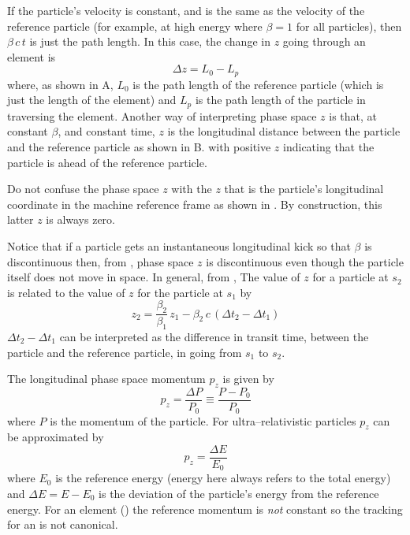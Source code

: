 If the particle's velocity is constant, and is the same as the velocity of the reference particle
(for example, at high energy where $\beta = 1$ for all particles), then $\beta \, c \, t$ is just
the path length. In this case, the change in $z$ going through an element is
\begin{equation}
  \Delta z = L_0 - L_p
\end{equation}
where, as shown in A, $L_0$ is the path length of the reference particle (which
is just the length of the element) and $L_p$ is the path length of the particle in traversing the
element.  Another way of interpreting phase space $z$ is that, at constant $\beta$, and constant
time, $z$ is the longitudinal distance between the particle and the reference particle as shown in
B. with positive $z$ indicating that the particle is ahead of the reference
particle.

Do not confuse the phase space $z$ with the $z$ that is the particle's longitudinal coordinate in
the machine reference frame as shown in . By construction, this latter $z$ is
always zero.

Notice that if a particle gets an instantaneous longitudinal kick so that $\beta$ is discontinuous
then, from , phase space $z$ is discontinuous even though the particle itself does not
move in space. In general, from , The value of $z$ for a particle at $s_2$ is related to
the value of $z$ for the particle at $s_1$ by
\begin{equation}
  z_2 = \frac{\beta_2}{\beta_1} \, z_1 - 
  \beta_2 \, c \, (\Delta t_2 - \Delta t_1)
  \label{zbbzb}
\end{equation}
$\Delta t_2 - \Delta t_1$ can be interpreted as the difference in transit time, between the particle
and the reference particle, in going from $s_1$ to $s_2$.

The longitudinal phase space momentum $p_z$ is given by
\begin{equation}
  p_z = \frac{\Delta P}{P_0} \equiv \frac{P - P_0}{P_0}
  \label{ppppp}
\end{equation}
where $P$ is the momentum of the particle. For ultra--relativistic particles $p_z$ can be
approximated by
\begin{equation}
  p_z = \frac{\Delta E}{E_0}
\end{equation}
where $E_0$ is the reference energy (energy here always refers to the total energy) and $\Delta E =
E - E_0$ is the deviation of the particle's energy from the reference energy. For an 
element () the reference momentum is {\it not} constant so the tracking for an
 is not canonical.


